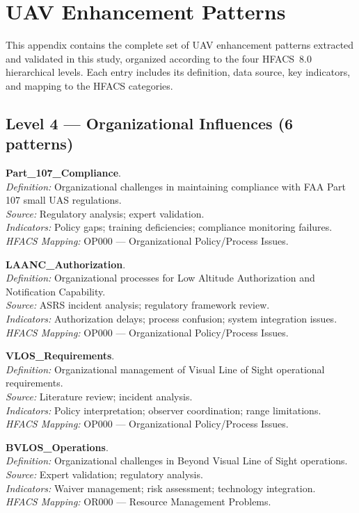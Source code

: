 
\appendixstart
\appendix
\section{UAV Enhancement Patterns}
\label{appendix:uav_patterns}
This appendix contains the complete set of UAV enhancement patterns extracted and validated in this study, organized according to the four HFACS~8.0 hierarchical levels. Each entry includes its definition, data source, key indicators, and mapping to the HFACS categories.

\newcommand{\patternentry}[5]{%
  \noindent\textbf{#1}.\\
  \textit{Definition:} #2\\
  \textit{Source:} #3\\
  \textit{Indicators:} #4\\
  \textit{HFACS Mapping:} #5\par\smallskip
}

\subsection*{Level 4 --- Organizational Influences (6 patterns)}

\patternentry{Part\_107\_Compliance}
{Organizational challenges in maintaining compliance with FAA Part 107 small UAS regulations.}
{Regulatory analysis; expert validation.}
{Policy gaps; training deficiencies; compliance monitoring failures.}
{OP000 --- Organizational Policy/Process Issues.}

\patternentry{LAANC\_Authorization}
{Organizational processes for Low Altitude Authorization and Notification Capability.}
{ASRS incident analysis; regulatory framework review.}
{Authorization delays; process confusion; system integration issues.}
{OP000 --- Organizational Policy/Process Issues.}

\patternentry{VLOS\_Requirements}
{Organizational management of Visual Line of Sight operational requirements.}
{Literature review; incident analysis.}
{Policy interpretation; observer coordination; range limitations.}
{OP000 --- Organizational Policy/Process Issues.}

\patternentry{BVLOS\_Operations}
{Organizational challenges in Beyond Visual Line of Sight operations.}
{Expert validation; regulatory analysis.}
{Waiver management; risk assessment; technology integration.}
{OR000 --- Resource Management Problems.}

